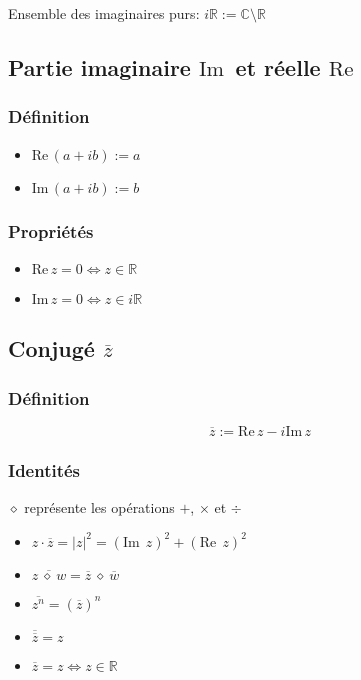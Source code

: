 \documentclass{article}
\newcommand{\im}{\text{Im}\,}
\newcommand{\re}{\text{Re}\,}
\newcommand{\R}{\mathds{R}}
\newcommand{\C}{\mathds{C}}
\newcommand{\conj}[1]{\overline{#1}}
\newcommand{\placeholder}{\diamond}
\begin{document}
Ensemble des imaginaires purs: $i\R := \C \setminus \R$

\subsection{Partie imaginaire $\im$ et réelle $\re$}
\subsubsection{Définition}
\begin{itemize}
    \item $\re(a + ib) := a$
    \item $\im(a + ib) := b$
\end{itemize}
\subsubsection{Propriétés}
\begin{itemize}
    \item $\re z = 0 \iff z \in \R$
    \item $\im z = 0 \iff z \in i\R$
\end{itemize}

\subsection{Conjugé $\conj{z}$}

\subsubsection{Définition}
\[\conj{z} := \re z - i\im z\]



\subsubsection{Identités}

$\placeholder$ représente les opérations $+$, $\times$ et $\div$

\begin{itemize}
    \item $z\cdot\conj{z} = |z|^2 = (\im\; z)^2 + (\re\; z)^2$
    \item $\conj{z \:\placeholder\: w} = \conj{z} \:\placeholder\: \conj{w}$
    \item $\conj{z^n} = (\conj{z})^n$
    \item $\conj{\conj{z}} = z $
    \item $\conj{z} = z \iff z \in \R$
\end{itemize}
\end{document}

